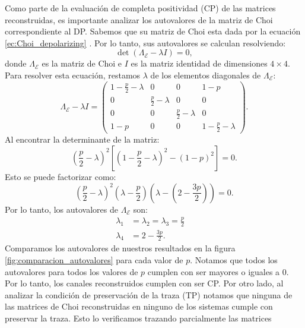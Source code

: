 \documentclass[letterpaper,12pt]{thesisECFM}
\theoremstyle{plain}
\theoremstyle{definition}
\theoremstyle{remark}
\newcommand{\1}{\mathbb{1}}
\begin{document}
Como parte de la evaluación de completa positividad (CP)  de las matrices
reconstruidas, es importante analizar los autovalores de la matriz de Choi
correspondiente al DP. Sabemos que su matriz de Choi esta
dada por la ecuación \ref{ec:Choi_depolarizing} . Por lo tanto, sus autovalores
se calculan resolviendo:
\begin{equation}
\det(\Lambda_\mathcal{E} - \lambda I) = 0,
\end{equation}
donde $\Lambda_\mathcal{E}$ es la matriz de Choi e $I$ es la matriz identidad
de dimensiones $4 \times 4$. Para resolver esta ecuación, restamos $\lambda$ de
los elementos diagonales de $\Lambda_\mathcal{E}$:
\begin{equation}
\Lambda_\mathcal{E} - \lambda I = \begin{pmatrix}
1 - \frac{p}{2} - \lambda & 0 & 0 & 1 - p \\
0 & \frac{p}{2} - \lambda & 0 & 0 \\
0 & 0 & \frac{p}{2} - \lambda & 0 \\
1 - p & 0 & 0 & 1 - \frac{p}{2} - \lambda
\end{pmatrix}.
\end{equation}
Al encontrar la determinante de la matriz:
\begin{equation}
\left( \frac{p}{2} - \lambda \right)^2  \left[ \left( 1 - \frac{p}{2} - \lambda \right)^2 - (1 - p)^2 \right] = 0.
\end{equation}
Esto se puede factorizar como:
\begin{equation}
\left( \frac{p}{2} - \lambda \right)^2 \left( \lambda - \frac{p}{2} \right) \left( \lambda - \left( 2 - \frac{3p}{2} \right) \right) = 0.
\end{equation}
Por lo tanto, los autovalores de $\Lambda_{\mathcal{E}}$ son:
\begin{align}
\lambda_1 &=\lambda_2=\lambda_3 = \frac{p}{2} \quad \\
\lambda_4 &= 2 - \frac{3p}{2} .
\end{align}
Comparamos los autovalores de nuestros resultados en la figura
\ref{fig:comparacion_autovalores} para cada valor de $p$. Notamos que todos los
autovalores para todos los valores de $p$ cumplen con ser mayores o iguales a
0. Por lo tanto, los canales reconstruidos cumplen con ser CP.  Por otro
lado, al analizar la condición de preservación de la traza (TP) notamos que
ninguna de las matrices de Choi reconstruidas en ninguno de los sistemas cumple
con preservar la traza. Esto lo verificamos trazando parcialmente las matrices
\end{document}
